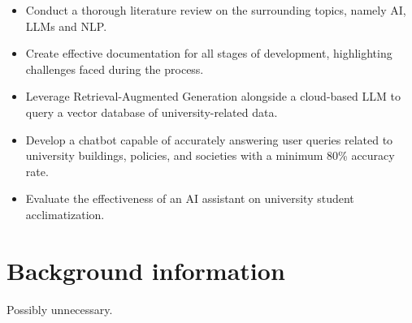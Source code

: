 \begin{itemize}
    \item Conduct a thorough literature review on the surrounding topics, namely AI, LLMs and NLP.
    \item Create effective documentation for all stages of development, highlighting challenges faced during the process.
    \item Leverage Retrieval-Augmented Generation alongside a cloud-based LLM to query a vector database of university-related data.
    \item Develop a chatbot capable of accurately answering user queries related to university 
    buildings, policies, and societies with a minimum 80\% accuracy rate.
    \item Evaluate the effectiveness of an AI assistant on university student acclimatization.
\end{itemize}

\section{Background information}
Possibly unnecessary.
